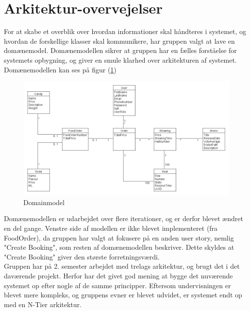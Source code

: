 \section{Arkitektur-overvejelser}\label{sec:arkitektur}
For at skabe et overblik over hvordan informationer skal håndteres i systemet,
og hvordan de forskellige klasser skal kommunikere, har gruppen valgt at lave en domænemodel.
Domænemodellen sikrer at gruppen har en fælles forståelse for systemets opbygning,
og giver en smule klarhed over arkitekturen af systemet.\\

Domænemodellen kan ses på figur (\ref{fig:domain})

\begin{figure}[h]
    \centering
    \includegraphics[width=1\textwidth]{figures/Domainmodel.png}
    \caption{Domainmodel}
    \label{fig:domain}
\end{figure}

Domænemodellen er udarbejdet over flere iterationer, og er derfor blevet ændret en del gange.
Venstre side af modellen er ikke blevet implementeret (fra FoodOrder), da gruppen har valgt at fokusere på
en anden user story, nemlig "Create Booking", som resten af domænemodellen beskriver. Dette skyldes at "Create Booking"
giver den største forretningsværdi. \\

Gruppen har på 2. semester arbejdet med trelags arkitektur, og brugt det i det daværende projekt.
Herfor har det givet god mening at bygge det nuværende systemet op efter nogle af de samme principper.
Eftersom undervisningen er blevet mere kompleks, og gruppens evner er blevet udvidet, er systemet endt op med en
N-Tier arkitektur.\\

